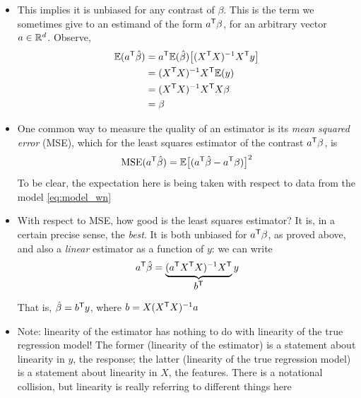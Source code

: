 \documentclass{article}
\begin{document}
\begin{itemize}
\item This implies it is unbiased for any contrast of $\beta$. This is the term 
  we sometimes give to an estimand of the form $a^{\mathsf{T}}\beta$, for an 
  arbitrary vector $a \in \mathbb{R}^d$. Observe, 
  \begin{align*}
  \mathbb{E}(a^{\mathsf{T}} \hat{\beta}) &= a^{\mathsf{T}} \mathbb{E}(\hat{\beta})\big[ (X^{\mathsf{T}} X)^{-1} X^{\mathsf{T}} y \big] \\
  &= (X^{\mathsf{T}} X)^{-1} X^{\mathsf{T}} \mathbb{E}(y) \\
  &= (X^{\mathsf{T}} X)^{-1} X^{\mathsf{T}} X \beta \\
  &= \beta
  \end{align*}

\item One common way to measure the quality of an estimator is its \emph{mean
    squared error} (MSE), which for the least squares estimator  of the contrast $a^{\mathsf{T}} \beta$, is
  \[
  \mathrm{MSE}(a^{\mathsf{T}} \hat{\beta}) = \mathbb{E}\big[ (a^{\mathsf{T}} \hat{\beta} - a^{\mathsf{T}} \beta) \big]^2
  \]
  To be clear, the expectation here is being taken with respect to data from the
  model \eqref{eq:model_wn} 

\item With respect to MSE, how good is the least squares estimator? It is, in a
  certain precise sense, the \emph{best}. It is both unbiased for $a^{\mathsf{T}} \beta$,
  as proved above, and also a \emph{linear} estimator as a function of $y$: we
  can write  
  \[
  a^{\mathsf{T}} \hat{\beta} = \underbrace{(a^{\mathsf{T}} X^{\mathsf{T}} X)^{-1}
    X^{\mathsf{T}}}_{\textstyle \begin{array}{c} b^{\mathsf{T}} \end{array}} y  
  \]
  That is, $\hat{\beta} = b^{\mathsf{T}} y$, where $b = X (X^{\mathsf{T}} X)^{-1} a$ 


\item Note: linearity of the estimator has nothing to do with linearity of the
  true regression model! The former (linearity of the estimator) is a statement
  about linearity in $y$, the response; the latter (linearity of the true
  regression model) is a statement about linearity in $X$, the features. There
  is a notational collision, but linearity is really referring to different
  things here 


\end{itemize}
\end{document}
